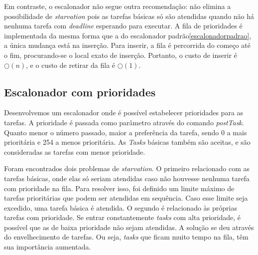 \documentclass[a4paper,onecolumn, 10pt]{article}
\begin{document}
Em contraste, o escalonador não segue outra recomendação: não elimina a possibilidade de 
\textit{starvation} pois as tarefas
básicas só são atendidas quando não há nenhuma tarefa com \textit{deadline} esperando para executar. 
A fila de prioridades é implementada da mesma forma que a do escalonador 
padrão\ref{escalonadorpadrao}, a única mudança está na inserção. Para
inserir, a fila é percorrida do começo até o fim, procurando-se o local exato de inserção.
Portanto, o custo de inserir é $\bigcirc(n)$, e o custo de retirar da fila é $\bigcirc(1)$. 


\subsection{Escalonador com prioridades}\label{escalonadorprioridade}
Desenvolvemos um escalonador onde é possível estabelecer prioridades para as tarefas. 
A prioridade é passada como parâmetro através 
do comando \textit{postTask}. Quanto menor o número passado, maior a preferência da tarefa, sendo 0 a
mais prioritária e 254 a menos prioritária.
As \textit{Tasks} básicas também são aceitas, e são consideradas as tarefas com menor prioridade.

Foram encontrados dois problemas de \textit{starvation}. O primeiro relacionado com as tarefas básicas,
onde elas só seriam atendidas caso não houvesse nenhuma tarefa com prioridade na fila. Para resolver isso, foi definido um
limite máximo de tarefas prioritárias que podem ser atendidas em sequência. Caso esse limite seja excedido, uma tarefa
básica é atendida. O segundo é relacionado às próprias tarefas com prioridade. 
Se entrar constantemente \textit{tasks} com alta
prioridade, é possível que as de baixa prioridade não sejam atendidas. A solução se deu através do envelhecimento de
tarefas. Ou seja, \textit{tasks} que ficam muito tempo na fila, têm sua importância aumentada.
\end{document}
